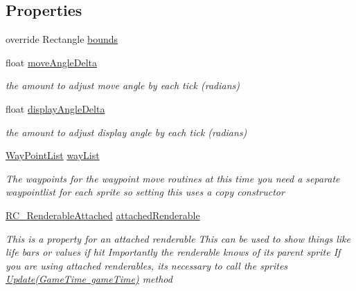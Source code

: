 \subsection*{Properties}
\begin{DoxyCompactItemize}
\item 
override Rectangle \mbox{\hyperlink{class_r_c___framework_1_1_sprite3_aa3f2de2ac85a5cb8f0753474ce2fc2f0}{bounds}}
\item 
float \mbox{\hyperlink{class_r_c___framework_1_1_sprite3_a2232d226353d716bf6928a252381ddd9}{move\+Angle\+Delta}}
\begin{DoxyCompactList}\small\item\em the amount to adjust move angle by each tick (radians) \end{DoxyCompactList}\item 
float \mbox{\hyperlink{class_r_c___framework_1_1_sprite3_ac2869487c1a7c38299b913adbb4f97b7}{display\+Angle\+Delta}}
\begin{DoxyCompactList}\small\item\em the amount to adjust display angle by each tick (radians) \end{DoxyCompactList}\item 
\mbox{\hyperlink{class_r_c___framework_1_1_way_point_list}{Way\+Point\+List}} \mbox{\hyperlink{class_r_c___framework_1_1_sprite3_a95fc30b1a8756bc02dd6fd8fcf9f81ec}{way\+List}}
\begin{DoxyCompactList}\small\item\em The waypoints for the waypoint move routines at this time you need a separate waypointlist for each sprite so setting this uses a copy constructor \end{DoxyCompactList}\item 
\mbox{\hyperlink{class_r_c___framework_1_1_r_c___renderable_attached}{R\+C\+\_\+\+Renderable\+Attached}} \mbox{\hyperlink{class_r_c___framework_1_1_sprite3_a4c216d42873e3e4d52d30596f3078bc8}{attached\+Renderable}}
\begin{DoxyCompactList}\small\item\em This is a property for an attached renderable This can be used to show things like life bars or values if hit Importantly the renderable knows of its parent sprite If you are using attached renderables, its necessary to call the sprites \mbox{\hyperlink{class_r_c___framework_1_1_sprite3_a5473d37c4f1f44fa1685dd64c82dfd8c}{Update(\+Game\+Time game\+Time)}} method \end{DoxyCompactList}\item 

\end{DoxyCompactItemize}
